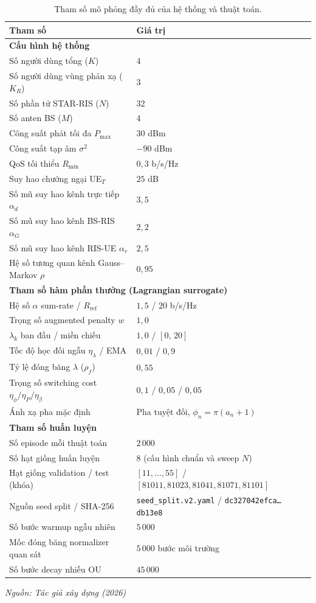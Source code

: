 \begin{table}[t]
\centering
\small
\caption{Tham số mô phỏng đầy đủ của hệ thống và thuật toán.}
\label{tab:simulation_parameters}
\begin{tabular}{ll}
\toprule
\textbf{Tham số} & \textbf{Giá trị} \\
\midrule
\multicolumn{2}{l}{\textbf{Cấu hình hệ thống}} \\
Số người dùng tổng ($K$) & 4 \\
Số người dùng vùng phản xạ ($K_R$) & 3 \\
Số phần tử STAR-RIS ($N$) & 32 \\
Số anten BS ($M$) & 4 \\
Công suất phát tối đa $P_{\max}$ & $30$ dBm \\
Công suất tạp âm $\sigma^2$ & $-90$ dBm \\
QoS tối thiểu $R_{\min}$ & $0{,}3$ b/s/Hz \\
Suy hao chướng ngại UE$_T$ & $25$ dB \\
Số mũ suy hao kênh trực tiếp $\alpha_d$ & $3{,}5$ \\
Số mũ suy hao kênh BS-RIS $\alpha_G$ & $2{,}2$ \\
Số mũ suy hao kênh RIS-UE $\alpha_r$ & $2{,}5$ \\
\midrule
Hệ số tương quan kênh Gauss--Markov $\rho$ & $0{,}95$ \\
\midrule
\multicolumn{2}{l}{\textbf{Tham số hàm phần thưởng (Lagrangian surrogate)}} \\
Hệ số $\alpha$ sum-rate / $R_{\text{ref}}$ & $1{,}5$ / $20$ b/s/Hz \\
Trọng số augmented penalty $w$ & $1{,}0$ \\
$\lambda_k$ ban đầu / miền chiếu & $1{,}0$ / $[0,\,20]$ \\
Tốc độ học đối ngẫu $\eta_\lambda$ / EMA & $0{,}01$ / $0{,}9$ \\
Tỷ lệ đóng băng $\lambda$ ($\rho_f$) & $0{,}55$ \\
Trọng số switching cost $\eta_\phi/\eta_P/\eta_\beta$ & $0{,}1$ / $0{,}05$ / $0{,}05$ \\
Ánh xạ pha mặc định & Pha tuyệt đối, $\phi_n=\pi(a_n+1)$ \\
\midrule
\multicolumn{2}{l}{\textbf{Tham số huấn luyện}} \\
Số episode mỗi thuật toán & $2\,000$ \\
Số hạt giống huấn luyện & $8$ (cấu hình chuẩn và sweep $N$) \\
Hạt giống validation / test (khóa) & $[11,\ldots,55]$ / $[81011,81023,81041,81071,81101]$ \\
Nguồn seed split / SHA-256 & \texttt{seed\_split.v2.yaml} / \texttt{dc327042efca\ldots db13e8} \\
Số bước warmup ngẫu nhiên & $5\,000$ \\
Mốc đóng băng normalizer quan sát & $5\,000$ bước môi trường \\
Số bước decay nhiễu OU & $45\,000$ \\
\bottomrule
\end{tabular}

\vspace{0.2em}
\hfill {\footnotesize\itshape Nguồn: Tác giả xây dựng (2026)}
\end{table}
